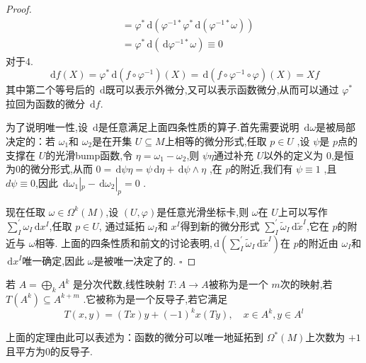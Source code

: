 \documentclass[../../几何与拓扑.tex]{subfiles}
\begin{document}
\begin{proof}
$$\begin{aligned}
     &=\varphi ^{*} \,\mathrm{d} \left( \varphi ^{-1*} \varphi ^{*} \,\mathrm{d} \left( \varphi ^{-1*} \omega  \right)  \right)\\ 
      & = \varphi ^{*} \,\mathrm{d} \left( \,\mathrm{d} \varphi ^{-1*} \omega  \right)       \equiv  0
    \end{aligned}
    $$对于4. $$
  \,\mathrm{d} f\left( X \right)  = \varphi ^{*}\,\mathrm{d} \left( f\circ \varphi ^{-1}  \right)  \left( X \right) =    \,\mathrm{d} \left( f\circ \varphi ^{-1} \circ \varphi  \right)\left( X \right) = Xf  
    $$其中第二个等号后的 $ \,\mathrm{d}  $既可以表示外微分,又可以表示函数微分,从而可以通过 $ \varphi ^{*} $  拉回为函数的微分 $ \,\mathrm{d} f $.
    
    为了说明唯一性,设 $ \,\mathrm{d}  $是任意满足上面四条性质的算子.首先需要说明 $ \,\mathrm{d}  \omega  $是被局部决定的：若 $  \omega _{1} $和 $  \omega _{2} $是在开集 $ U\subseteq M $上相等的微分形式,任取 $ p \in U $ ,设 $ \psi  $是 $ p $点的支撑在 $ U $的光滑bump函数,令 $ \eta  =  \omega _{1}- \omega _{2} $,则 $ \psi \eta  $通过补充 $ U $以外的定义为 $ 0 $,是恒为0的微分形式,从而 $ 0 = \,\mathrm{d} \psi \eta = \psi \,\mathrm{d} \eta +  \,\mathrm{d} \psi \wedge \eta  $ ,在 $ p $的附近,我们有 $ \psi  \equiv  1 $ ,且
    $ d\psi \equiv 0 $,因此 $ \,\mathrm{d}  \omega _{1}|_{p}-\,\mathrm{d}  \omega _{2}|_{p}=0 $ .


    现在任取 $  \omega  \in  \Omega ^{k}\left( M \right)  $,设 $ \left( U,\varphi  \right)  $是任意光滑坐标卡,则 $  \omega  $在 $ U $上可以写作 $ \sum _{I}^{\prime}  \omega _{I} \,\mathrm{d} x^{I} $,任取 $ p \in U $, 通过延拓 $  \omega _{I} $和 $ x^{I} $得到新的微分形式 $ \sum _{I}^{\prime}  \tilde{\omega}_{I} \,\mathrm{d}  \tilde{x}^{I} $,它在 $ p $的附近与 $  \omega  $相等.          
    上面的四条性质和前文的讨论表明,$  \,\mathrm{d} \left( \sum _{I}^{\prime}  \tilde{\omega}_{I}\,\mathrm{d} \tilde{x}^{I} \right)  $在 $ p $的附近由 $  \omega _{I} $和 $\,\mathrm{d}  x^{I} $唯一确定,因此 $  \omega  $是被唯一决定了的.  
    \hfill $\square$
\end{proof}

\begin{definition}
    若 $ A = \bigoplus _{k} A^{k}$ 是分次代数,线性映射 $ T: A\to A  $被称为是一个 $ m $次的映射,若 $ T\left( A^{k} \right)\subseteq A^{k+ m}  $   .它被称为是一个反导子,若它满足 $$
    T\left( x,y \right)= \left( Tx \right)y+  \left( -1 \right)^{k}x\left( Ty \right)    ,\quad x\in A^{k},y \in A^{l}
    $$
\end{definition}
\begin{remark}
    上面的定理由此可以表述为：函数的微分可以唯一地延拓到 $  \Omega ^{*}\left( M \right)  $上次数为 $ + 1 $ 且平方为0的反导子. 
\end{remark}
\end{document}
